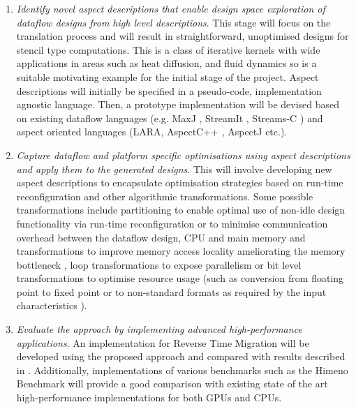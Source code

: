\begin{enumerate}

\item \emph{Identify novel aspect descriptions that enable design
  space exploration of dataflow designs from high level
  descriptions}. This stage will focus on the translation process and
  will result in straightforward, unoptimised designs for stencil type
  computations. This is a class of iterative kernels with wide
  applications in areas such as heat diffusion, and fluid dynamics so
  is a suitable motivating example for the initial stage of the
  project.  Aspect descriptions will initially be specified in a
  pseudo-code, implementation agnostic language. Then, a prototype
  implementation will be devised based on existing dataflow languages
  (e.g. MaxJ \cite{MaxelerTechnologies:2012}, StreamIt
  \cite{Thies:Karczmarek:Amarasinghe:2002}, Streams-C
  \cite{Gokhale:Stone:Arnold:Kalinowski:2000}) and aspect oriented
  languages (LARA, AspectC++ \cite{Spinczyk:Gal:Schroder:2002},
  AspectJ \cite{Gradecki:Lesiecki:2003} etc.).

\item \emph{Capture dataflow and platform specific optimisations
  using aspect descriptions and apply them to the generated
  designs}. This will involve developing new aspect descriptions to
  encapsulate optimisation strategies based on run-time
  reconfiguration and other algorithmic transformations. Some possible
  transformations include partitioning to enable optimal use of
  non-idle design functionality via run-time reconfiguration
  \cite{Xinyu:Qiwei:Luk:Qiang:Pell:2012} or to minimise communication
  overhead between the dataflow design, CPU and main memory
  \cite{Sato:Inoguchi:Luk:Nahamura:2012} and transformations to
  improve memory access locality ameliorating the memory bottleneck
  \cite{Cong:Zhang:Zou:2012, Cong:Zhang:Zou:2011}, loop
  transformations to expose parallelism \cite{wolfe1995high} or bit
  level transformations to optimise resource usage (such as conversion
  from floating point to fixed point or to non-standard formats as
  required by the input characteristics
  \cite[pp. 13-26]{Cardoso:Diniz:Weinhardt:2010}).

\item \emph{Evaluate the approach by implementing advanced
  high-performance applications}. An implementation for Reverse Time
  Migration will be developed using the proposed approach and compared
  with results described in \cite{fu2011eliminating,
    araya2011assessing}. Additionally, implementations of various
  benchmarks such as the Himeno Benchmark
  \cite{Sato:Inoguchi:Luk:Nahamura:2012} will provide a good
  comparison with existing state of the art high-performance
  implementations for both GPUs and CPUs.

\end{enumerate}

